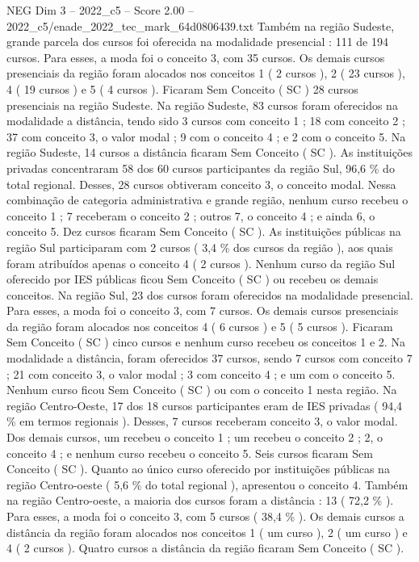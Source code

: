 \begin{textsample}{NEG Dim 3 – 2022\_c5 – Score 2.00 – 2022\_c5/enade\_2022\_tec\_mark\_64d0806439.txt}
Também na região Sudeste, grande parcela dos cursos foi oferecida na modalidade presencial : 111 de 194 cursos.
Para esses, a moda foi o conceito 3, com 35 cursos.
Os demais cursos presenciais da região foram alocados nos conceitos 1 ( 2 cursos ), 2 ( 23 cursos ), 4 ( 19 cursos ) e 5 ( 4 cursos ).
Ficaram Sem Conceito ( SC ) 28 cursos presenciais na região Sudeste.
Na região Sudeste, 83 cursos foram oferecidos na modalidade a distância, tendo sido 3 cursos com conceito 1 ; 18 com conceito 2 ; 37 com conceito 3, o valor modal ; 9 com o conceito 4 ; e 2 com o conceito 5.
Na região Sudeste, 14 cursos a distância ficaram Sem Conceito ( SC ).
As instituições privadas concentraram 58 dos 60 cursos participantes da região Sul, 96,6 \% do total regional.
Desses, 28 cursos obtiveram conceito 3, o conceito modal.
Nessa combinação de categoria administrativa e grande região, nenhum curso recebeu o conceito 1 ; 7 receberam o conceito 2 ; outros 7, o conceito 4 ; e ainda 6, o conceito 5.
Dez cursos ficaram Sem Conceito ( SC ).
As instituições públicas na região Sul participaram com 2 cursos ( 3,4 \% dos cursos da região ), aos quais foram atribuídos apenas o conceito 4 ( 2 cursos ).
Nenhum curso da região Sul oferecido por IES públicas ficou Sem Conceito ( SC ) ou recebeu os demais conceitos.
Na região Sul, 23 dos cursos foram oferecidos na modalidade presencial.
Para esses, a moda foi o conceito 3, com 7 cursos.
Os demais cursos presenciais da região foram alocados nos conceitos 4 ( 6 cursos ) e 5 ( 5 cursos ).
Ficaram Sem Conceito ( SC ) cinco cursos e nenhum curso recebeu os conceitos 1 e 2.
Na modalidade a distância, foram oferecidos 37 cursos, sendo 7 cursos com conceito 7 ; 21 com conceito 3, o valor modal ; 3 com conceito 4 ; e um com o conceito 5.
Nenhum curso ficou Sem Conceito ( SC ) ou com o conceito 1 nesta região.
Na região Centro-Oeste, 17 dos 18 cursos participantes eram de IES privadas ( 94,4 \% em termos regionais ).
Desses, 7 cursos receberam conceito 3, o valor modal.
Dos demais cursos, um recebeu o conceito 1 ; um recebeu o conceito 2 ; 2, o conceito 4 ; e nenhum curso recebeu o conceito 5.
Seis cursos ficaram Sem Conceito ( SC ).
Quanto ao único curso oferecido por instituições públicas na região Centro-oeste ( 5,6 \% do total regional ), apresentou o conceito 4.
Também na região Centro-oeste, a maioria dos cursos foram a distância : 13 ( 72,2 \% ).
Para esses, a moda foi o conceito 3, com 5 cursos ( 38,4 \% ).
Os demais cursos a distância da região foram alocados nos conceitos 1 ( um curso ), 2 ( um curso ) e 4 ( 2 cursos ).
Quatro cursos a distância da região ficaram Sem Conceito ( SC ).

\end{textsample}
